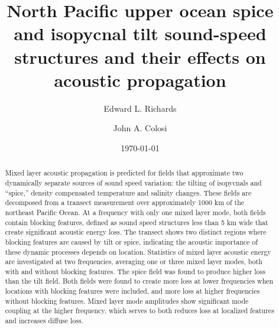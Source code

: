 \documentclass[preprint,NumberedRefs]{JASA}
\begin{document}
\title[Mixed layer tilt and spice]{North Pacific upper ocean spice and isopycnal tilt sound-speed structures and their effects on acoustic propagation}
\author{Edward L. Richards}
\author{John A. Colosi}


\date{\today}


\begin{abstract}
Mixed layer acoustic propagation is predicted for fields that approximate two dynamically separate sources of sound speed variation: the tilting of isopycnals and “spice,” density compensated temperature and salinity changes. These fields are decomposed from a transect measurement over approximately 1000 km of the northeast Pacific Ocean. At a frequency with only one mixed layer mode, both fields contain blocking features, defined as sound speed structures less than 5 km wide that create significant acoustic energy loss. The transect shows two distinct regions where blocking features are caused by tilt or spice, indicating the acoustic importance of these dynamic processes depends on location. Statistics of mixed layer acoustic energy are investigated at two frequencies, averaging one or three mixed layer modes, both with and without blocking features. The spice field was found to produce higher loss than the tilt field. Both fields were found to create more loss at lower frequencies when locations with blocking features were included, and more loss at higher frequencies without blocking features. Mixed layer mode amplitudes show significant mode coupling at the higher frequency, which serves to both reduces loss at localized features and increases diffuse loss.

\end{abstract}

\maketitle
\end{document}
